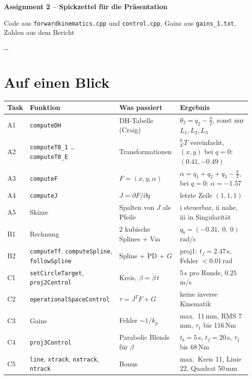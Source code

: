 \documentclass[10pt,a4paper]{article}
\makeatletter
\newcommand{\secneed}[1]{\par\penalty\@M\begingroup\setlength{\dimen@}{#1}\dimen@ii\pagegoal
  \advance\dimen@ii-\pagetotal\ifdim\dimen@>\dimen@ii\ifdim\dimen@ii>\z@\vfil\fi\penalty-\@M\fi\endgroup}
\let\oldsection\section
\renewcommand{\section}{\secneed{9\baselineskip}\oldsection}
\newcommand{\code}[1]{\texttt{#1}}
\makeatother
\begin{document}
\small

{\LARGE\bfseries Assignment 2 -- Spickzettel für die Präsentation}\par
\vspace{2pt}
{\large Code aus \code{forwardkinematics.cpp} und \code{control.cpp}, Gains aus \code{gains\_1.txt},
Zahlen aus dem Bericht}

\section{Auf einen Blick}

{\small\setlength{\tabcolsep}{4pt}
\begin{tabular}{@{}llll@{}}
  \toprule
  Task & Funktion & Was passiert & Ergebnis \\
  \midrule
  A1 & \code{computeDH} & DH-Tabelle (Craig) & $\theta_2 = q_2 - \frac{\pi}{2}$, sonst nur $L_1, L_2, L_3$ \\
  A2 & \code{computeT0\_1} \ldots{} \code{computeT0\_E} & Transformationen & ${}^0_ET$ vereinfacht, $(x, y)$ bei $q = 0$: $(0.41, -0.49)$ \\
  A3 & \code{computeF} & $F = (x, y, \alpha)$ & $\alpha = q_1 + q_2 + q_3 - \frac{\pi}{2}$, bei $q = 0$: $\alpha = -1.57$ \\
  A4 & \code{computeJ} & $J = \partial F / \partial q$ & letzte Zeile $(1, 1, 1)$ \\
  A5 & Skizze & Spalten von $J$ als Pfeile & i steuerbar, ii nahe, iii in Singularität \\
  B1 & Rechnung & 2 kubische Splines + Via & $\dot q_b = (-0.31,\ 0,\ 0)$\,rad/s \\
  B2 & \code{computeTf}, \code{computeSpline}, \code{followSpline} & Spline + PD + $G$ & proj1: $t_f = 2.47$\,s, Fehler $< 0.01$\,rad \\
  C1 & \code{setCircleTarget}, \code{proj2Control} & Kreis, $\beta = \dot\beta\,t$ & 5\,s pro Runde, $0.25$\,m/s \\
  C2 & \code{operationalSpaceControl} & $\tau = J^T F + G$ & keine inverse Kinematik \\
  C3 & Gains & Fehler $\sim 1/k_p$ & max.\ 11\,mm, RMS 7\,mm, $\tau_1$ bis 116\,Nm \\
  C4 & \code{proj3Control} & Parabolic Blends für $\beta$ & $t_b = 5$\,s, $t_f = 20$\,s, $\tau_1$ bis 68\,Nm \\
  C5 & \code{line}, \code{xtrack}, \code{nxtrack}, \code{ntrack} & Bonus & max.\ Kreis 11, Linie 22, Quadrat 50\,mm \\
  \bottomrule
\end{tabular}
}
\end{document}

